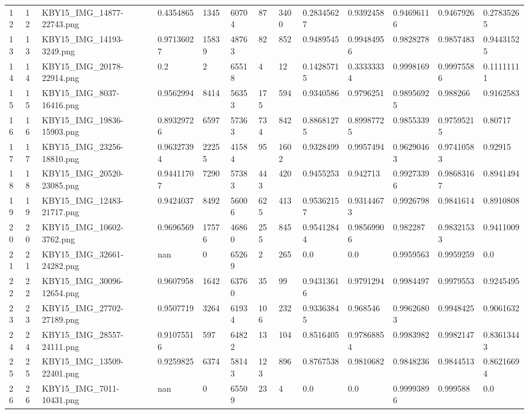 \documentclass[11pt, a4paper, twoside]{report}
\begin{document}
\begin{longtable}[c]{@{}lllllllllllll@{}}
12 & 12 & KBY15\_IMG\_14877-22743.png & 0.4354865 & 1345 & 60704 & 87 & 3400 & 0.28345627 & 0.9392458 & 0.94696116 & 0.9467926 & 0.27835265 \\
13 & 13 & KBY15\_IMG\_14193-3249.png & 0.97136027 & 15839 & 48763 & 82 & 852 & 0.9489545 & 0.99484956 & 0.9828278 & 0.9857483 & 0.94431525 \\
14 & 14 & KBY15\_IMG\_20178-22914.png & 0.2 & 2 & 65518 & 4 & 12 & 0.14285715 & 0.33333334 & 0.9998169 & 0.99975586 & 0.11111111 \\
15 & 15 & KBY15\_IMG\_8037-16416.png & 0.9562994 & 8414 & 56353 & 175 & 594 & 0.9340586 & 0.9796251 & 0.98956925 & 0.988266 & 0.9162583 \\
16 & 16 & KBY15\_IMG\_19836-15903.png & 0.89329726 & 6597 & 57363 & 734 & 842 & 0.88681275 & 0.89987725 & 0.9855339 & 0.97595215 & 0.80717 \\
17 & 17 & KBY15\_IMG\_23256-18810.png & 0.96327394 & 22255 & 41584 & 95 & 1602 & 0.9328499 & 0.9957494 & 0.96290463 & 0.97410583 & 0.92915 \\
18 & 18 & KBY15\_IMG\_20520-23085.png & 0.94411707 & 7290 & 57383 & 443 & 420 & 0.9455253 & 0.942713 & 0.99273396 & 0.98683167 & 0.8941494 \\
19 & 19 & KBY15\_IMG\_12483-21717.png & 0.9424037 & 8492 & 56006 & 625 & 413 & 0.95362157 & 0.93144673 & 0.9926798 & 0.9841614 & 0.8910808 \\
20 & 20 & KBY15\_IMG\_10602-3762.png & 0.9696569 & 17576 & 46860 & 255 & 845 & 0.95412844 & 0.98569906 & 0.982287 & 0.98321533 & 0.9411009 \\
21 & 21 & KBY15\_IMG\_32661-24282.png & nan & 0 & 65269 & 2 & 265 & 0.0 & 0.0 & 0.9959563 & 0.9959259 & 0.0 \\
22 & 22 & KBY15\_IMG\_30096-12654.png & 0.9607958 & 1642 & 63760 & 35 & 99 & 0.94313616 & 0.9791294 & 0.9984497 & 0.9979553 & 0.9245495 \\
23 & 23 & KBY15\_IMG\_27702-27189.png & 0.9507719 & 3264 & 61934 & 106 & 232 & 0.93363845 & 0.968546 & 0.99626803 & 0.9948425 & 0.9061632 \\
24 & 24 & KBY15\_IMG\_28557-24111.png & 0.91075516 & 597 & 64822 & 13 & 104 & 0.8516405 & 0.97868854 & 0.9983982 & 0.9982147 & 0.83613443 \\
25 & 25 & KBY15\_IMG\_13509-22401.png & 0.9259825 & 6374 & 58143 & 123 & 896 & 0.8767538 & 0.9810682 & 0.9848236 & 0.9844513 & 0.86216694 \\
26 & 26 & KBY15\_IMG\_7011-10431.png & nan & 0 & 65509 & 23 & 4 & 0.0 & 0.0 & 0.99993896 & 0.999588 & 0.0 \\

\end{longtable}
\end{document}
